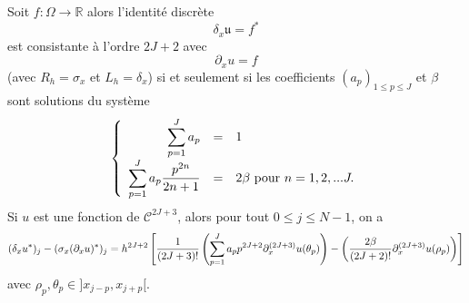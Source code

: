 \begin{theoreme}
Soit $f : \Omega \rightarrow \mathbb{R}$ alors l'identité discrète
\begin{equation}
\delta_{x} \mathfrak{u} = f^*
\end{equation}
est consistante à l'ordre $2J+2$ avec 
\begin{equation}
\partial_x u = f
\end{equation}
(avec $R_h = \sigma_x$ et $L_h = \delta_{x}$) si et seulement si les coefficients $(a_p)_{1 \leq p \leq J}$ et $\beta$ sont solutions du système
\begin{equation}
\left\lbrace
\begin{array}{rcl}
\displaystyle\sum\limits_{p=1}^J a_p & = & 1 \\
\displaystyle\sum\limits_{p=1}^J a_p \dfrac{p^{2n}}{2n+1} & = & 2 \beta  \text{ pour } n=1,2,...J.
\end{array}
\right.
\label{eq:hermitian_system}
\end{equation}
Si $u$ est une fonction de $\mathcal{C}^{2J+3}$, alors pour tout $0 \leq j \leq N-1$, on a 
\begin{equation}
(\delta_{x} u^*)_j - (\sigma_{x} (\partial_x u)^*)_j = h^{2J+2} \left[ \dfrac{1}{(2J+3)!}  \left( \displaystyle\sum\limits_{p=1}^J a_p  p^{2J+2} \partial_x^{(2J+3)}u(\theta_p)\right)  - \left( \dfrac{2\beta}{(2J+2)!}    \partial_x^{(2J+3)}u(\rho_p)\right) \right]
\label{eq:eq_cons}
\end{equation} 
avec $\rho_p, \theta_p \in ]x_{j-p}, x_{j+p}[$.
\label{th:consistance_delta_x_implicite}
\end{theoreme}



